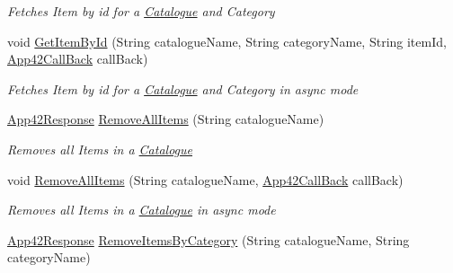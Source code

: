\begin{DoxyCompactItemize}
\begin{DoxyCompactList}\small\item\em Fetches Item by id for a \hyperlink{classcom_1_1shephertz_1_1app42_1_1paas_1_1sdk_1_1csharp_1_1shopping_1_1_catalogue}{Catalogue} and Category \end{DoxyCompactList}\item 
void \hyperlink{classcom_1_1shephertz_1_1app42_1_1paas_1_1sdk_1_1csharp_1_1shopping_1_1_catalogue_service_a8df820fe2a504a38ee74750b148b8776}{Get\+Item\+By\+Id} (String catalogue\+Name, String category\+Name, String item\+Id, \hyperlink{interfacecom_1_1shephertz_1_1app42_1_1paas_1_1sdk_1_1csharp_1_1_app42_call_back}{App42\+Call\+Back} call\+Back)
\begin{DoxyCompactList}\small\item\em Fetches Item by id for a \hyperlink{classcom_1_1shephertz_1_1app42_1_1paas_1_1sdk_1_1csharp_1_1shopping_1_1_catalogue}{Catalogue} and Category in async mode \end{DoxyCompactList}\item 
\hyperlink{classcom_1_1shephertz_1_1app42_1_1paas_1_1sdk_1_1csharp_1_1_app42_response}{App42\+Response} \hyperlink{classcom_1_1shephertz_1_1app42_1_1paas_1_1sdk_1_1csharp_1_1shopping_1_1_catalogue_service_a2dd0670445128d24bd6e4fad3f475efc}{Remove\+All\+Items} (String catalogue\+Name)
\begin{DoxyCompactList}\small\item\em Removes all Items in a \hyperlink{classcom_1_1shephertz_1_1app42_1_1paas_1_1sdk_1_1csharp_1_1shopping_1_1_catalogue}{Catalogue} \end{DoxyCompactList}\item 
void \hyperlink{classcom_1_1shephertz_1_1app42_1_1paas_1_1sdk_1_1csharp_1_1shopping_1_1_catalogue_service_ae2636e38391468718b4da6cd5439293a}{Remove\+All\+Items} (String catalogue\+Name, \hyperlink{interfacecom_1_1shephertz_1_1app42_1_1paas_1_1sdk_1_1csharp_1_1_app42_call_back}{App42\+Call\+Back} call\+Back)
\begin{DoxyCompactList}\small\item\em Removes all Items in a \hyperlink{classcom_1_1shephertz_1_1app42_1_1paas_1_1sdk_1_1csharp_1_1shopping_1_1_catalogue}{Catalogue} in async mode \end{DoxyCompactList}\item 
\hyperlink{classcom_1_1shephertz_1_1app42_1_1paas_1_1sdk_1_1csharp_1_1_app42_response}{App42\+Response} \hyperlink{classcom_1_1shephertz_1_1app42_1_1paas_1_1sdk_1_1csharp_1_1shopping_1_1_catalogue_service_a1193e803a18dfaa512a774cb8cb2268b}{Remove\+Items\+By\+Category} (String catalogue\+Name, String category\+Name)

\end{DoxyCompactItemize}

